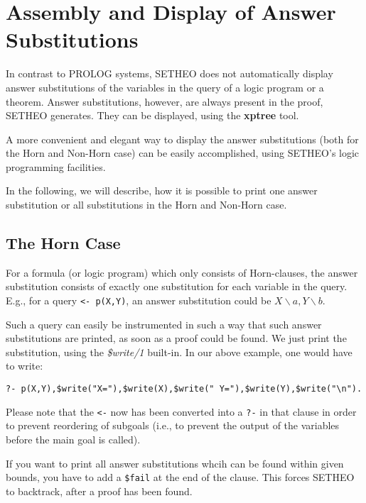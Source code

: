 %

\section{Assembly and Display of Answer Substitutions}

In contrast to PROLOG systems, SETHEO does not automatically
display answer substitutions of the variables in the query of
a logic program or a theorem.
Answer substitutions, however, are always present in the proof,
SETHEO generates. They can be displayed, using the {\bf xptree}
tool.

A more convenient and elegant way to display the answer substitutions
(both for the Horn and Non-Horn case) can be easily accomplished, using
SETHEO's logic programming facilities.

In the following, we will describe, how it is possible to print
one answer substitution or all substitutions in the Horn and Non-Horn case.

\subsection{The Horn Case}

For a formula (or logic program) which only consists of Horn-clauses,
the answer substitution consists of exactly one substitution for each
variable in the query.
E.g., for a query {\tt <- p(X,Y)}, an answer substitution could be
$ X\backslash a, Y\backslash b$. 

Such a query can easily be instrumented in such a way that such
answer substitutions are printed, as soon as a proof could be found.
We just print the substitution, using the {\em \$write/1\/} built-in.
In our above example, one would have to write:
\begin{center}
{\verb+?- p(X,Y),$write("X="),$write(X),$write(" Y="),$write(Y),$write("\n").+}
\end{center}

Please note that the {\tt <-} now has been converted into a {\tt ?-}
in that clause in order to prevent reordering of subgoals 
(i.e., to prevent the output of the variables before the main goal is called).

If you want to print all answer substitutions whcih can be found within
given bounds, you have to add a {\tt \$fail} at the end of the clause.
This forces SETHEO to backtrack, after a proof has been found.

